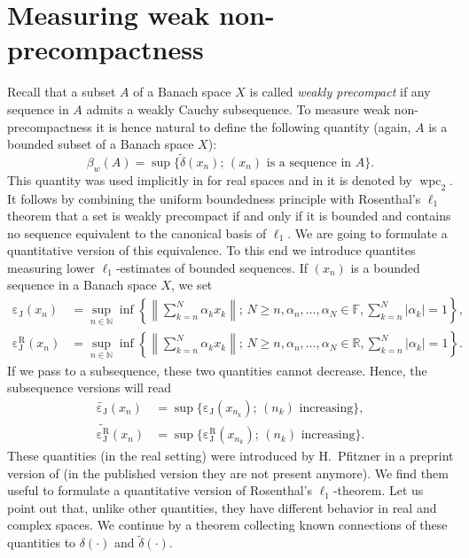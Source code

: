 \documentclass{amsart}
\numberwithin{equation}{section}
\theoremstyle{definition}
\def\en{\mathbb N}
\def\er{\mathbb R}
\def\ef{\mathbb F}
\def\wde#1{\widetilde{\delta}\left(#1\right)}
\def\de#1{\delta\left(#1\right)}
\def\cj#1{\operatorname{\varepsilon_J}\left(#1\right)}
\def\dcj#1{\widetilde{\operatorname{\varepsilon_J}}\left(#1\right)}
\def\cjr#1{\operatorname{\varepsilon_J^R}\left(#1\right)}
\def\dcjr#1{\widetilde{\operatorname{\varepsilon_J^R}}\left(#1\right)}
\newcommand{\norm}[1]{\left\|#1\right\|}
\newcommand{\abs}[1]{\left|#1\right|}
\newcommand{\setsep}{;\,}
\begin{document}
\section{Measuring weak non-precompactness}\label{sec:rosenthal}

Recall that a subset $A$ of a Banach space $X$ is called \emph{weakly precompact} if any sequence in $A$ admits a weakly Cauchy subsequence. To measure weak non-precompactness it is hence natural to define the following quantity (again, $A$ is a bounded subset of a Banach space $X$):
$$\beta_w(A)=\sup\{\wde{x_n}\setsep (x_n)\mbox{ is a sequence in }A\}.$$
This quantity was used implicitly in \cite{rodr-ep-wpc} for real spaces and in \cite{kania-qgp} it is denoted by 
$\operatorname{wpc}_2$. 
It follows by combining the uniform boundedness principle with Rosenthal's $\ell_1$ theorem that a set is weakly precompact if and only if it is bounded and contains no sequence equivalent to the canonical basis of $\ell_1$.
We are going to formulate a quantitative version of this equivalence. To this end we introduce quantites measuring 
 lower $\ell_1$-estimates of bounded sequences. If $(x_n)$ is a bounded sequence in a Banach space $X$, we set
$$\begin{aligned}
 \cj{x_n}&=\sup_{n\in\en} \inf \left\{ \norm{\sum_{k=n}^N\alpha_k x_k} \setsep N\ge n, \alpha_n,\dots,\alpha_N\in\ef, \sum_{k=n}^N\abs{\alpha_k}=1\right\},\\   
 \cjr{x_n}&=\sup_{n\in\en} \inf \left\{ \norm{\sum_{k=n}^N\alpha_k x_k} \setsep N\ge n, \alpha_n,\dots,\alpha_N\in\er, \sum_{k=n}^N\abs{\alpha_k}=1\right\}.
\end{aligned}$$
If we pass to a subsequence, these two quantities cannot decrease. Hence, the subsequence versions will read 
$$\begin{aligned}
\dcj{x_n} & = \sup\{ \cj{x_{n_k}}\setsep (n_k)\mbox{ increasing}\},\\
\dcjr{x_n} & = \sup\{ \cjr{x_{n_k}}\setsep (n_k)\mbox{ increasing}\}.
\end{aligned}$$
These quantities (in the real setting) were introduced by H.~Pfitzner in a preprint version of \cite{pfitzner-inve} (in the published version they are not present anymore). We find them useful to formulate a quantitative version of Rosenthal's $\ell_1$-theorem. Let us point out that, unlike other quantities, they have different behavior in real and complex spaces. We continue by a theorem collecting known connections of these quantities to $\de{\cdot}$ and $\wde{\cdot}$.
\end{document}
